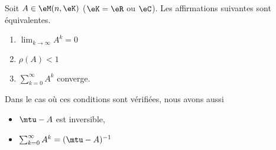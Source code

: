 \begin{theorem}   \label{THOooMNLGooKETwhh}
	Soit \( A\in \eM(n,\eK)\) (\( \eK=\eR\) ou \( \eC\)). Les affirmations suivantes sont équivalentes.
	\begin{enumerate}
		\item       \label{ITEMooCGLSooZsMXSt}
		      \( \lim_{k\to \infty} A^k=0\)
		\item       \label{ITEMooYBGEooXAzVbD}
		      \( \rho(A)<1\)
		\item       \label{ITEMooEJSQooTqkBbo}
		      \( \sum_{k=0}^{\infty}A^k\) converge.
	\end{enumerate}
	Dans le cas où ces conditions sont vérifiées, nous avons aussi
	\begin{itemize}
		\item \( \mtu-A\) est inversible,
		\item
		      \(\sum_{k=0}^{\infty}A^k=(\mtu - A)^{-1}\)
	\end{itemize}
\end{theorem}

